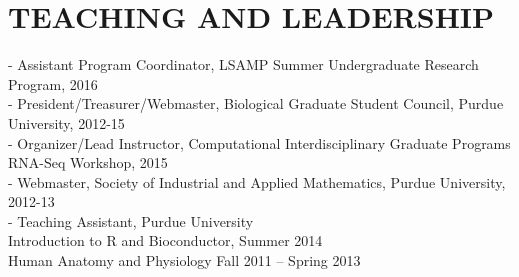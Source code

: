\documentclass[11pt,letterpaper,sans]{moderncv}        %
\begin{document}
{\section{TEACHING AND LEADERSHIP}
\begin{minipage}{\maincolumnwidth}%
	\small{
          - Assistant Program Coordinator, LSAMP Summer Undergraduate Research Program, 2016\\
          - President/Treasurer/Webmaster, Biological Graduate Student Council, Purdue University, 2012-15\\
          - Organizer/Lead Instructor, Computational Interdisciplinary Graduate Programs RNA-Seq Workshop, 2015\\
          - Webmaster, Society of Industrial and Applied Mathematics, Purdue University, 2012-13\\
	- Teaching Assistant, Purdue University\\
		\tab \quad  \bullet Introduction to R and Bioconductor, Summer 2014\\ 
		\tab \quad \bullet  Human Anatomy and Physiology Fall 2011 – Spring 2013
	}%
\end{minipage}%

}
\nocite{*}



\end{document}
